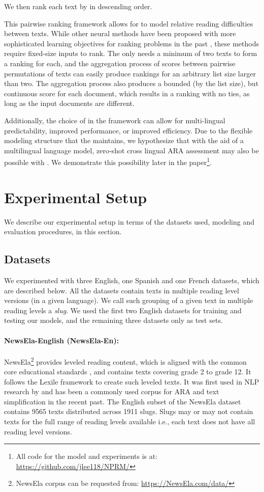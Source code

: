 \documentclass[11pt]{article}
\begin{document}
We then rank each text  by  in descending order.

This pairwise ranking framework allows for  to model relative reading difficulties between texts. While other neural methods have been proposed with more sophisticated learning objectives for ranking problems in the past \cite{Wang.Li.ea-18, Ai.Wang.ea-19}, these methods require fixed-size inputs to rank. The  only needs a minimum of two texts to form a ranking for each, and the aggregation process of scores between pairwise permutations of texts can easily produce rankings for an arbitrary list size larger than two. The  aggregation process also produces a bounded (by the list size), but continuous score for each document, which results in a ranking with no ties, as long as the input documents are different. 

Additionally, the choice of  in the  framework can allow for multi-lingual predictability, improved performance, or improved efficiency. Due to the flexible modeling structure that the  maintains, we hypothesize that with the aid of a multilingual language model, zero-shot cross lingual ARA assessment may also be possible with . We demonstrate this possibility later in the paper\footnote{All code for the model and experiments is at: \url{https://github.com/jlee118/NPRM/}}. 

\section{Experimental Setup}
\label{sec:setup}
We describe our experimental setup in terms of the datasets used, modeling and evaluation procedures, in this section. 
\subsection{Datasets}
We experimented with three English, one Spanish and one French datasets, which are described below. All the datasets contain texts in multiple reading level versions (in a given language). We call such grouping of a given text in multiple reading levels a \textit{slug}. We used the first two English datasets for training and testing our models, and the remaining three datasets only as test sets.

\paragraph{NewsEla-English (NewsEla-En):} NewsEla\footnote{NewsEla corpus can be requested from: \url{https://NewsEla.com/data/}} provides leveled reading content, which is aligned with the common core educational standards \cite{Porter.McMaken.ea-11}, and contains texts covering grade 2 to grade 12. It follows the Lexile \cite{Stenner-96} framework to create such leveled texts. It was first used in NLP research by  and has been a commonly used corpus for ARA and text simplification in the recent past. The English subset of the NewsEla dataset contains 9565 texts distributed across 1911 slugs. Slugs may or may not contain texts for the full range of reading levels available i.e., each text does not have all reading level versions.
\end{document}
